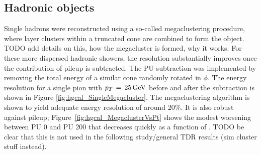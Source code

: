 \subsection{Hadronic objects}

Single hadrons were reconstructed using a so-called megaclustering procedure, where layer clusters within a truncated cone are combined to form the object. 
TODO add details on this, how the megacluster is formed, why it works.
For these more dispersed hadronic showers, the resolution substantially improves once the contribution of pileup is subtracted.
The PU subtraction was implemented by removing the total energy of a similar cone randomly rotated in $\phi$. 
The energy resolution for a single pion with $p_T\,=\,\SI{25}{GeV}$ before and after the subtraction is shown in Figure \ref{fig:hgcal_SingleMegacluster}. 
The megaclustering algorithm is shown to yield adequate energy resolution of around 20\%. 
It is also robust against pileup; Figure~\ref{fig:hgcal_MegaclusterVsPt} shows the modest worsening between PU 0 and PU 200 that decreases quickly as a function of \pt.
TODO be clear that this is not used in the following study/general TDR results (sim cluster stuff instead).

